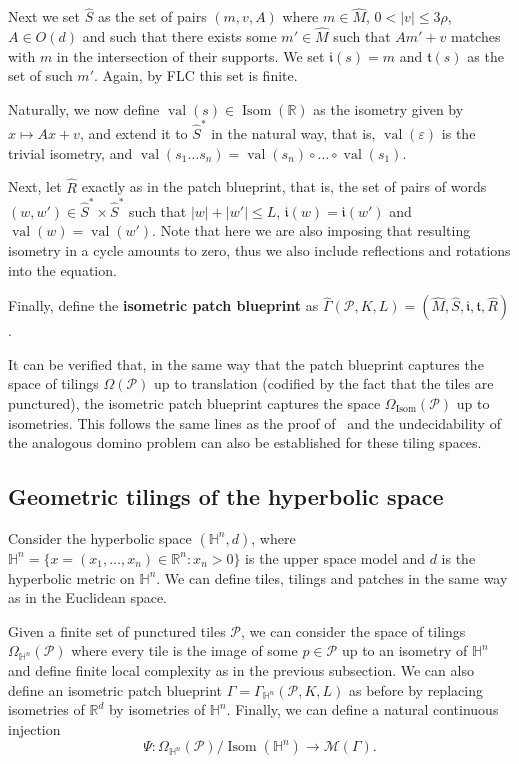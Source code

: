 \documentclass{article}
\theoremstyle{definition}
\theoremstyle{definition}
\newcommand{\RR}{\mathbb{R}}
\newcommand{\PP}{\mathcal{P}}
\newcommand{\init}{\mathfrak{i}}
\newcommand{\ter}{\mathfrak{t}}
\newcommand{\val}{\operatorname{val}}
\newcommand{\define}[1]{\textbf{#1}}
\begin{document}
Next we set $\widehat{S}$ as the set of pairs $(m,v,A)$ where $m\in \widehat{M}$, $0<|v|\leq 3\rho$, $A\in O(d)$ and such that there exists some $m'\in \widehat{M}$ such that $Am'+v$ matches with $m$ in the intersection of their supports. We set $\init(s)=m$ and $\ter(s)$ as the set of such $m'$. Again, by FLC this set is finite.

Naturally, we now define $\val(s)\in \operatorname{Isom}(\RR)$ as the isometry given by $x\mapsto Ax+v$, and extend it to $\widehat{S}^*$ in the natural way, that is, $\val(\varepsilon)$ is the trivial isometry, and $\val(s_1\dots s_n) = \val(s_n)\circ \dots \circ \val(s_1)$. 

Next, let $\widehat{R}$ exactly as in the patch blueprint, that is, the set of pairs of words $(w,w')\in \widehat{S}^*\times \widehat{S}^*$ such that $|w|+|w'|\leq L$, $\init(w)=\init(w')$ and $\val(w)=\val(w')$. Note that here we are also imposing that resulting isometry in a cycle amounts to zero, thus we also include reflections and rotations into the equation.

Finally, define the \define{isometric patch blueprint} as $\widehat{\Gamma}(\mathcal{P},K,L) = (\widehat{M},\widehat{S},\init,\ter,\widehat{R})$.

It can be verified that, in the same way that the patch blueprint captures the space of tilings $\Omega(\PP)$ up to translation (codified by the fact that the tiles are punctured), the isometric patch blueprint captures the space $\Omega_{\operatorname{Isom}}(\PP)$ up to isometries. This follows the same lines as the proof of~ and the undecidability of the analogous domino problem can also be established for these tiling spaces.

\subsection{Geometric tilings of the hyperbolic space} Consider the hyperbolic space $(\mathbb{H}^n,d)$, where $\mathbb{H}^n = \{ x = (x_1,\dots,x_n) \in \RR^n : x_n >0 \}$ is the upper space model and $d$ is the hyperbolic metric on $\mathbb{H}^n$. We can define tiles, tilings and patches in the same way as in the Euclidean space. 

Given a finite set of punctured tiles $\PP$, we can consider the space of tilings $\Omega_{\mathbb{H}^n}(\PP)$ where every tile is the image of some $p\in \PP$ up to an isometry of $\mathbb{H}^n$ and define finite local complexity as in the previous subsection. We can also define an isometric patch blueprint $\Gamma = \Gamma_{\mathbb{H}^n}(\PP,K,L)$ as before by replacing isometries of $\RR^d$ by isometries of $\mathbb{H}^n$. Finally, we can define a natural continuous injection \[ \Psi\colon \Omega_{\mathbb{H}^n}(\PP)/\operatorname{Isom}(\mathbb{H}^n) \to \mathcal{M}(\Gamma). \]
\end{document}
